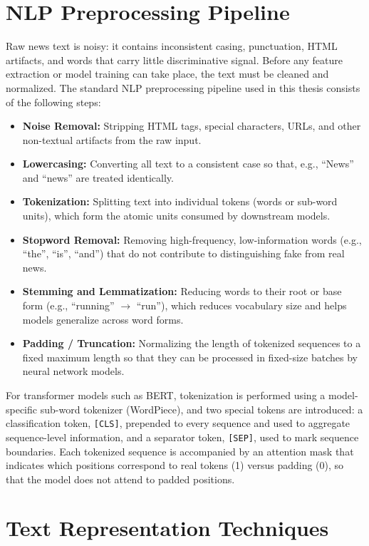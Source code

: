 \section{NLP Preprocessing Pipeline}

Raw news text is noisy: it contains inconsistent casing, punctuation, HTML artifacts, and words that carry little discriminative signal. Before any feature extraction or model training can take place, the text must be cleaned and normalized. The standard NLP preprocessing pipeline used in this thesis consists of the following steps:

\begin{itemize}
\item \textbf{Noise Removal:} Stripping HTML tags, special characters, URLs, and other non-textual artifacts from the raw input.
\item \textbf{Lowercasing:} Converting all text to a consistent case so that, e.g., ``News'' and ``news'' are treated identically.
\item \textbf{Tokenization:} Splitting text into individual tokens (words or sub-word units), which form the atomic units consumed by downstream models.
\item \textbf{Stopword Removal:} Removing high-frequency, low-information words (e.g., ``the'', ``is'', ``and'') that do not contribute to distinguishing fake from real news.
\item \textbf{Stemming and Lemmatization:} Reducing words to their root or base form (e.g., ``running'' $\rightarrow$ ``run''), which reduces vocabulary size and helps models generalize across word forms.
\item \textbf{Padding / Truncation:} Normalizing the length of tokenized sequences to a fixed maximum length so that they can be processed in fixed-size batches by neural network models.
\end{itemize}

For transformer models such as BERT, tokenization is performed using a model-specific sub-word tokenizer (WordPiece), and two special tokens are introduced: a classification token, \texttt{[CLS]}, prepended to every sequence and used to aggregate sequence-level information, and a separator token, \texttt{[SEP]}, used to mark sequence boundaries. Each tokenized sequence is accompanied by an attention mask that indicates which positions correspond to real tokens (1) versus padding (0), so that the model does not attend to padded positions.

\section{Text Representation Techniques}

